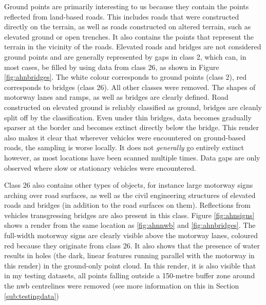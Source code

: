Ground points are primarily interesting to us because they contain the points reflected from land-based roads. This includes roads that were constructed directly on the terrain, as well as roads constructed on altered terrain, such as elevated ground or open trenches. It also contains the points that represent the terrain in the vicinity of the roads. Elevated roads and bridges are not considered ground points and are generally represented by gaps in class 2, which can, in most cases, be filled by using data from class 26, as shown in Figure \ref{fig:ahnbridges}. The white colour corresponds to ground points (class 2), red corresponds to bridges (class 26). All other classes were removed. The shapes of motorway lanes and ramps, as well as bridges are clearly defined. Road constructed on elevated ground is reliably classified as ground, bridges are cleanly split off by the classification. Even under thin bridges, data becomes gradually sparser at the border and becomes extinct directly below the bridge. This render also makes it clear that wherever vehicles were encountered on ground-based roads, the sampling is worse locally. It does not \textit{generally} go entirely extinct however, as most locations have been scanned multiple times. Data gaps are only observed where slow or stationary vehicles were encountered.

Class 26 also contains other types of objects, for instance large motorway signs arching over road surfaces, as well as the civil engineering structures of elevated roads and bridges (in addition to the road surfaces on them). Reflections from vehicles transgressing bridges are also present in this class. Figure \ref{fig:ahnsigns} shows a render from the same location as \ref{fig:ahnnwb} and \ref{fig:ahnbridges}. The full-width motorway signs are clearly visible above the motorway lanes, coloured red because they originate from class 26. It also shows that the presence of water results in holes (the dark, linear features running parallel with the motorway in this render) in the ground-only point cloud. In this render, it is also visible that in my testing datasets, all points falling outside a 150-metre buffer zone around the \ac{nwb} centrelines were removed (see more information on this in Section \ref{sub:testingdata})

